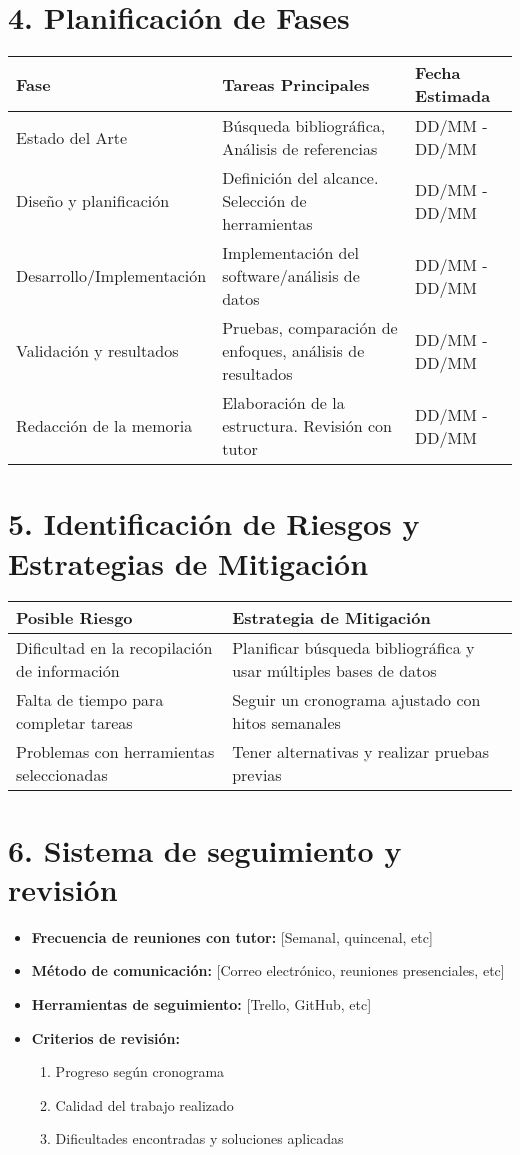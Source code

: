 \documentclass[12pt, a4paper]{article}
\begin{document}
\section*{4. Planificación de Fases}
\begin{tabularx}{\textwidth}{|l|X|l|}
    \hline
    \textbf{Fase} & \textbf{Tareas Principales} & \textbf{Fecha Estimada} \\ \hline
    Estado del Arte & Búsqueda bibliográfica, Análisis de referencias & DD/MM - DD/MM \\ \hline
    Diseño y planificación & Definición del alcance. Selección de herramientas & DD/MM - DD/MM \\ \hline
    Desarrollo/Implementación & Implementación del software/análisis de datos & DD/MM - DD/MM \\ \hline
    Validación y resultados & Pruebas, comparación de enfoques, análisis de resultados & DD/MM - DD/MM \\ \hline
    Redacción de la memoria & Elaboración de la estructura. Revisión con tutor & DD/MM - DD/MM \\ \hline
\end{tabularx}

\section*{5. Identificación de Riesgos y Estrategias de Mitigación}
\begin{tabularx}{\textwidth}{|l|X|}
    \hline
    \textbf{Posible Riesgo} & \textbf{Estrategia de Mitigación} \\ \hline
    Dificultad en la recopilación de información & Planificar búsqueda bibliográfica y usar múltiples bases de datos \\ \hline
    Falta de tiempo para completar tareas & Seguir un cronograma ajustado con hitos semanales \\ \hline
    Problemas con herramientas seleccionadas & Tener alternativas y realizar pruebas previas \\ \hline
\end{tabularx}

\section*{6. Sistema de seguimiento y revisión}
\begin{itemize}
    \item \textbf{Frecuencia de reuniones con tutor:} [Semanal, quincenal, etc]
    \item \textbf{Método de comunicación:} [Correo electrónico, reuniones presenciales, etc]
    \item \textbf{Herramientas de seguimiento:} [Trello, GitHub, etc]
    \item \textbf{Criterios de revisión:}
    \begin{enumerate}
        \item Progreso según cronograma
        \item Calidad del trabajo realizado
        \item Dificultades encontradas y soluciones aplicadas
    \end{enumerate}
\end{itemize}
\end{document}

